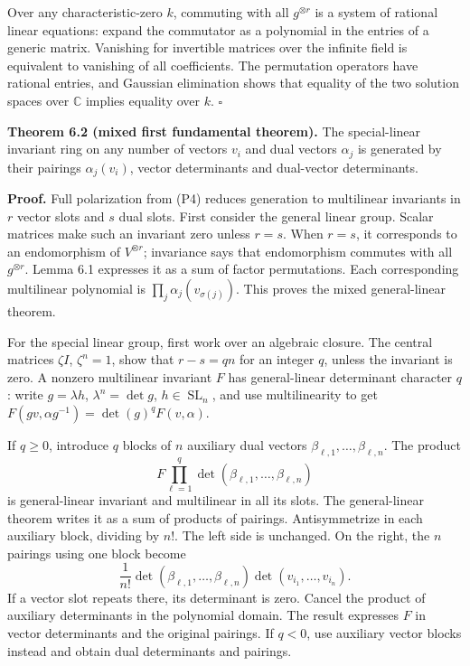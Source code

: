 \documentclass[
]{article}
\begin{document}
Over any characteristic-zero \(k\), commuting with all \(g^{\otimes r}\)
is a system of rational linear equations: expand the commutator as a
polynomial in the entries of a generic matrix. Vanishing for invertible
matrices over the infinite field is equivalent to vanishing of all
coefficients. The permutation operators have rational entries, and
Gaussian elimination shows that equality of the two solution spaces over
\(\mathbb C\) implies equality over \(k\). \(\square\)

\protect{}\label{theorem-6-2}{}

\textbf{Theorem 6.2 (mixed first fundamental theorem).} The
special-linear invariant ring on any number of vectors \(v_i\) and dual
vectors \(\alpha_j\) is generated by their pairings \(\alpha_j(v_i)\),
vector determinants and dual-vector determinants.

\textbf{Proof.} Full polarization from (P4) reduces generation to
multilinear invariants in \(r\) vector slots and \(s\) dual slots. First
consider the general linear group. Scalar matrices make such an
invariant zero unless \(r=s\). When \(r=s\), it corresponds to an
endomorphism of \(V^{\otimes r}\); invariance says that endomorphism
commutes with all \(g^{\otimes r}\). Lemma 6.1 expresses it as a sum of
factor permutations. Each corresponding multilinear polynomial is
\(\prod_j\alpha_j(v_{\sigma(j)})\). This proves the mixed general-linear
theorem.

For the special linear group, first work over an algebraic closure. The
central matrices \(\zeta I\), \(\zeta^n=1\), show that \(r-s=qn\) for an
integer \(q\), unless the invariant is zero. A nonzero multilinear
invariant \(F\) has general-linear determinant character \(q\): write
\(g=\lambda h\), \(\lambda^n=\det g\), \(h\in\operatorname{SL}_n\), and
use multilinearity to get \(F(gv,\alpha g^{-1})=\det(g)^qF(v,\alpha)\).

If \(q\geq0\), introduce \(q\) blocks of \(n\) auxiliary dual vectors
\(\beta_{\ell,1},\ldots,\beta_{\ell,n}\). The product \[
F\prod_{\ell=1}^q\det(\beta_{\ell,1},\ldots,\beta_{\ell,n})
\] is general-linear invariant and multilinear in all its slots. The
general-linear theorem writes it as a sum of products of pairings.
Antisymmetrize in each auxiliary block, dividing by \(n!\). The left
side is unchanged. On the right, the \(n\) pairings using one block
become \[
\frac1{n!}\det(\beta_{\ell,1},\ldots,\beta_{\ell,n})
\det(v_{i_1},\ldots,v_{i_n}).
\] If a vector slot repeats there, its determinant is zero. Cancel the
product of auxiliary determinants in the polynomial domain. The result
expresses \(F\) in vector determinants and the original pairings. If
\(q<0\), use auxiliary vector blocks instead and obtain dual
determinants and pairings.
\end{document}
